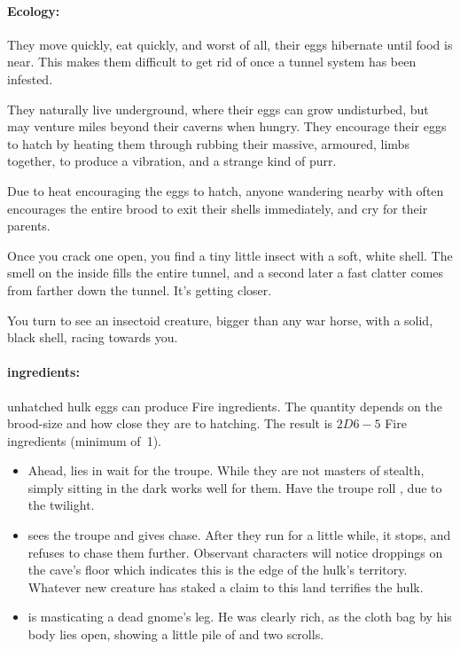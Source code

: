 \begin{multicols}{2}
\paragraph{Ecology:}
They move quickly, eat quickly, and worst of all, their eggs hibernate until food is near.
This makes them difficult to get rid of once a tunnel system has been infested.

They naturally live underground, where their eggs can grow undisturbed, but may venture miles beyond their caverns when hungry.
They encourage their eggs to hatch by heating them through rubbing their massive, armoured, limbs together, to produce a vibration, and a strange kind of purr.

Due to heat encouraging the eggs to hatch, anyone wandering nearby with  often encourages the entire brood to exit their shells immediately, and cry for their parents.

\begin{boxtext}
  Once you crack one open, you find a tiny little insect with a soft, white shell.
  The smell on the inside fills the entire tunnel, and a second later a fast clatter comes from farther down the tunnel.
  It's getting closer.

  You turn to see an insectoid creature, bigger than any war horse, with a solid, black shell, racing towards you.
\end{boxtext}

\index[mana]{Fire!\expandafter\Glsentrytext{hulk} eggs~\glsentrytext{A}}
\paragraph{\Glspl{ingredient}:}
unhatched \gls{hulk} eggs can produce Fire \glspl{ingredient}.
The quantity depends on the brood-size and how close they are to hatching.
The result is $2D6-5$ Fire \glspl{ingredient} (minimum of~1).

\showEnc

\begin{itemize}
  \item
  Ahead,  lies in wait for the troupe.
  While they are not masters of stealth, simply sitting in the dark works well for them.
  Have the troupe roll , \tn[9] due to the twilight.
  \item
   sees the troupe and gives chase.
  After they run for a little while, it stops, and refuses to chase them further.
  Observant characters will notice droppings on the cave's floor which indicates this is the edge of the \gls{hulk}'s territory.
  Whatever new creature has staked a claim to this land terrifies the \gls{hulk}.
  \item
   is masticating a dead gnome's leg.
  He was clearly rich, as the cloth bag by his body lies open, showing a little pile of  and two scrolls.
\end{itemize}


\end{multicols}
